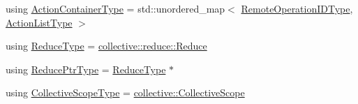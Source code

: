 \begin{DoxyCompactItemize}
\item 
using \hyperlink{structvt_1_1group_1_1_group_manager_af722b277e2ad6a8dacdfec0184cd8f2f}{Action\+Container\+Type} = std\+::unordered\+\_\+map$<$ \hyperlink{namespacevt_1_1group_a73f2624ddeb535b39a08b6524f26b244}{Remote\+Operation\+I\+D\+Type}, \hyperlink{structvt_1_1group_1_1_group_manager_a48b2dd05bbdda19c5d6195b8932a2716}{Action\+List\+Type} $>$
\item 
using \hyperlink{structvt_1_1group_1_1_group_manager_a28113adbc42622f7cf278fcaed4efefa}{Reduce\+Type} = \hyperlink{structvt_1_1collective_1_1reduce_1_1_reduce}{collective\+::reduce\+::\+Reduce}
\item 
using \hyperlink{structvt_1_1group_1_1_group_manager_a0c646983506b624ad93ceb127df9e811}{Reduce\+Ptr\+Type} = \hyperlink{structvt_1_1group_1_1_group_manager_a28113adbc42622f7cf278fcaed4efefa}{Reduce\+Type} $\ast$
\item 
using \hyperlink{structvt_1_1group_1_1_group_manager_a376be92b957fb33ac9b855f6d134ca6a}{Collective\+Scope\+Type} = \hyperlink{structvt_1_1collective_1_1_collective_scope}{collective\+::\+Collective\+Scope}
\end{DoxyCompactItemize}
